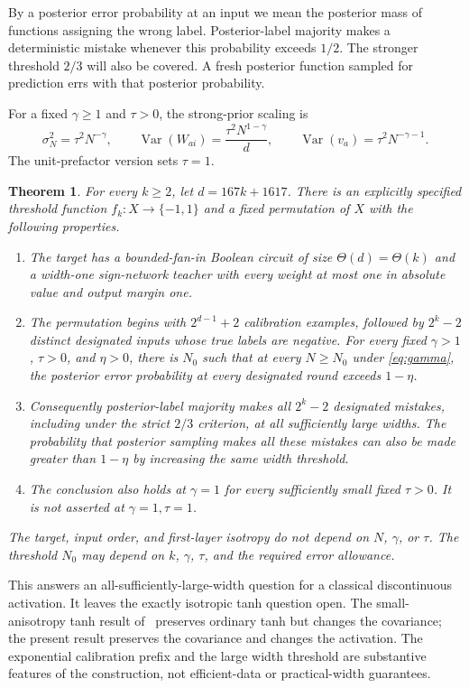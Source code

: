 \documentclass[11pt]{article}
\newtheorem{theorem}{Theorem}
\begin{document}
By a posterior error probability at an input we mean the posterior mass
of functions assigning the wrong label. Posterior-label majority makes
a deterministic mistake whenever this probability exceeds $1/2$.
The stronger threshold $2/3$ will also be covered. A fresh posterior
function sampled for prediction errs with that posterior probability.

For a fixed $\gamma\ge1$ and $\tau>0$, the strong-prior scaling is
\begin{equation}\label{eq:gamma}
 \sigma_N^2=\tau^2N^{-\gamma},\qquad
 \operatorname{Var}(W_{ai})=\frac{\tau^2N^{1-\gamma}}d,
 \qquad \operatorname{Var}(v_a)=\tau^2N^{-\gamma-1}.
\end{equation}
The unit-prefactor version sets $\tau=1$.

\begin{theorem}\label{thm:main}
For every $k\ge2$, let $d=167k+1617$. There is an explicitly specified
threshold function $f_k:X\to\{-1,1\}$ and a fixed permutation of $X$
with the following properties.
\begin{enumerate}
\item The target has a bounded-fan-in Boolean circuit of size
$\Theta(d)=\Theta(k)$ and a width-one sign-network teacher with every
weight at most one in absolute value and output margin one.
\item The permutation begins with $2^{d-1}+2$ calibration examples,
followed by $2^k-2$ distinct designated inputs whose true labels are
negative. For every fixed $\gamma>1$, $\tau>0$, and $\eta>0$, there is
$N_0$ such that at every $N\ge N_0$ under \eqref{eq:gamma}, the posterior
error probability at every designated round exceeds $1-\eta$.
\item Consequently posterior-label majority makes all $2^k-2$
designated mistakes, including under the strict $2/3$ criterion, at all
sufficiently large widths. The probability that posterior sampling makes
all these mistakes can also be made greater than $1-\eta$ by increasing
the same width threshold.
\item The conclusion also holds at $\gamma=1$ for every sufficiently
small fixed $\tau>0$. It is not asserted at $\gamma=1,\tau=1$.
\end{enumerate}
The target, input order, and first-layer isotropy do not depend on $N$,
$\gamma$, or $\tau$. The threshold $N_0$ may depend on $k$, $\gamma$,
$\tau$, and the required error allowance.
\end{theorem}

This answers an all-sufficiently-large-width question for a classical
discontinuous activation. It leaves the exactly isotropic tanh question
open. The small-anisotropy tanh result of~\cite{anisotropic} preserves
ordinary tanh but changes the covariance; the present result preserves
the covariance and changes the activation. The exponential calibration
prefix and the large width threshold are substantive features of the
construction, not efficient-data or practical-width guarantees.
\end{document}

